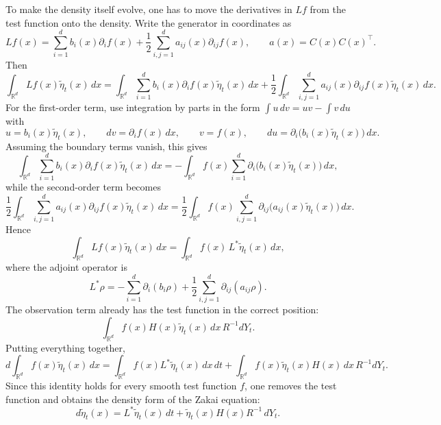 \documentclass[11pt]{article}
\theoremstyle{definition}
\theoremstyle{remark}
\begin{document}
To make the density itself evolve, one has to move the derivatives in $Lf$ from the test function onto the density. Write the generator in coordinates as
\[
Lf(x)=\sum_{i=1}^d b_i(x)\partial_i f(x)+\frac12\sum_{i,j=1}^d a_{ij}(x)\partial_{ij}f(x),
\qquad a(x)=C(x)C(x)^\top.
\]
Then
\[
\int_{\mathbb R^d} Lf(x)\tilde \eta_t(x)\,dx
=
\int_{\mathbb R^d}\sum_{i=1}^d b_i(x)\partial_i f(x)\tilde \eta_t(x)\,dx
+
\frac12\int_{\mathbb R^d}\sum_{i,j=1}^d a_{ij}(x)\partial_{ij}f(x)\tilde \eta_t(x)\,dx.
\]
For the first-order term, use integration by parts in the form $\int u\,dv=uv-\int v\,du$ with
\[
u=b_i(x)\tilde \eta_t(x),
\qquad
dv=\partial_i f(x)\,dx,
\qquad
v=f(x),
\qquad
du=\partial_i\bigl(b_i(x)\tilde \eta_t(x)\bigr)\,dx.
\]
Assuming the boundary terms vanish, this gives
\[
\int_{\mathbb R^d}\sum_{i=1}^d b_i(x)\partial_i f(x)\tilde \eta_t(x)\,dx
=
-\int_{\mathbb R^d} f(x)\sum_{i=1}^d \partial_i\bigl(b_i(x)\tilde \eta_t(x)\bigr)\,dx,
\]
while the second-order term becomes
\[
\frac12\int_{\mathbb R^d}\sum_{i,j=1}^d a_{ij}(x)\partial_{ij}f(x)\tilde \eta_t(x)\,dx
=
\frac12\int_{\mathbb R^d} f(x)\sum_{i,j=1}^d \partial_{ij}\bigl(a_{ij}(x)\tilde \eta_t(x)\bigr)\,dx.
\]
Hence
\[
\int_{\mathbb R^d} Lf(x)\tilde \eta_t(x)\,dx
=
\int_{\mathbb R^d} f(x)\,L^*\tilde \eta_t(x)\,dx,
\]
where the adjoint operator is
\[
L^*\rho
=
-\sum_{i=1}^d \partial_i(b_i\rho)+\frac12\sum_{i,j=1}^d \partial_{ij}(a_{ij}\rho).
\]
The observation term already has the test function in the correct position:
\[
\int_{\mathbb R^d} f(x)H(x)\tilde \eta_t(x)\,dx\,R^{-1}dY_t.
\]
Putting everything together,
\[
d\int_{\mathbb R^d} f(x)\tilde \eta_t(x)\,dx
=
\int_{\mathbb R^d} f(x)L^*\tilde \eta_t(x)\,dx\,dt
+
\int_{\mathbb R^d} f(x)\tilde \eta_t(x)H(x)\,dx\,R^{-1}dY_t.
\]
Since this identity holds for every smooth test function $f$, one removes the test function and obtains the density form of the Zakai equation:
\[
d\tilde \eta_t(x)=L^*\tilde \eta_t(x)\,dt+\tilde \eta_t(x)H(x)R^{-1}\,dY_t.
\]
\end{document}
